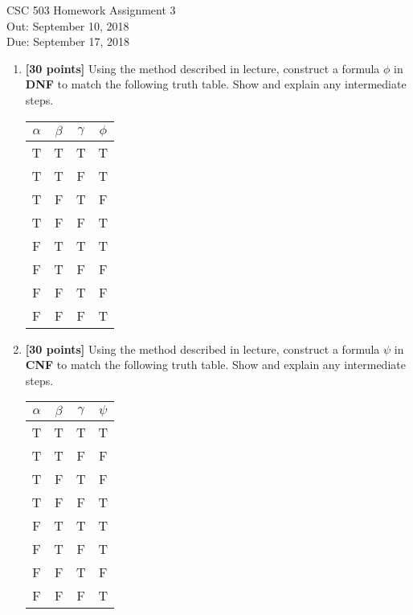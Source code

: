 \documentclass{article}
\begin{document}
\begin{center}
  {\LARGE CSC 503 Homework Assignment 3}\\[1pc]
  Out: September 10, 2018 \\
  Due: September 17, 2018 \\
\end{center}

\begin{enumerate}

\item \textbf{[30 points]} Using the method described in lecture, construct a
  formula $\phi$ in \textbf{DNF} to match the following truth table.
  Show and explain any intermediate steps.
  \begin{center}
    \begin{tabular}{ccc|c}
      $\alpha$ & $\beta$ & $\gamma$ & $\phi$ \\ \hline
      T & T & T & T\\
      T & T & F & T\\
      T & F & T & F\\
      T & F & F & T\\
      F & T & T & T\\
      F & T & F & F\\
      F & F & T & F\\
      F & F & F & T
    \end{tabular}
  \end{center}

\item \textbf{[30 points]} Using the method described in lecture,
  construct a formula $\psi$ in \textbf{CNF} to match the following
  truth table.  Show and explain any intermediate steps.
  \begin{center}
    \begin{tabular}{ccc|c}
      $\alpha$ & $\beta$ & $\gamma$ & $\psi$ \\ \hline
      T & T & T & T\\
      T & T & F & F\\
      T & F & T & F\\
      T & F & F & T\\
      F & T & T & T\\
      F & T & F & T\\
      F & F & T & F\\
      F & F & F & T
    \end{tabular}
  \end{center}


\end{enumerate}
\end{document}
